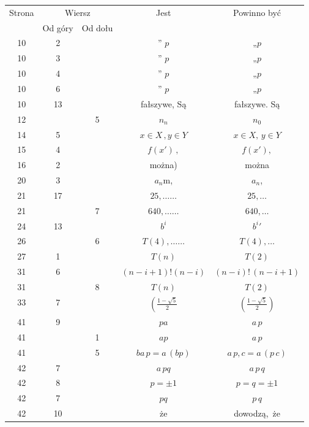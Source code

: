\documentclass[a4paper,11pt]{article}
\begin{document}
\begin{center}

  \begin{tabular}{|c|c|c|c|c|}
    \hline
    Strona & \multicolumn{2}{c|}{Wiersz} & Jest
                              & Powinno być \\ \cline{2-3}
    & Od góry & Od dołu & & \\
    \hline
    10  &  2 & & ” $p$ & „$p$ \\
    10  &  3 & & ” $p$ & „$p$ \\
    10  &  4 & & ” $p$ & „$p$ \\
    10  &  6 & & ” $p$ & „$p$ \\
    10  & 13 & & fałszywe, Są & fałszywe. Są \\
    12  & &  5 & $n_{ n }$ & $n_{ 0 }$ \\
    14  &  5 & & $x \in X \, , y \in Y$ & $x \in X, \, y \in Y$ \\
    15  &  4 & & $f( x' ) \, ,$ & $f( x' ),$ \\
    16  &  2 & & można) & można \\
    20  &  3 & & $a_{ n }$m, & $a_{ n }$, \\
    21  & 17 & & $25, \ldots \ldots$ & $25, \ldots$ \\
    21  & &  7 & $640, \ldots \ldots$ & $640, \ldots$ \\
    24  & 13 & & $b^{ i }$ & $b^{ i }{}'$ \\
    26  & &  6 & $T( 4 ), \ldots \ldots$ & $T( 4 ), \ldots$ \\
    27  &  1 & & $T( n )$ & $T( 2 )$ \\
    31  &  6 & & $( n - i + 1 )! ( n - i )$
    & $( n - i )! \, ( n - i + 1 )$ \\
    31  & &  8 & $T( n )$ & $T( 2 )$ \\
    33  &  7 & & $\left( \frac{ 1 - \sqrt{ 5 } }{ 2 } \right.$
    & $\left( \frac{ 1 - \sqrt{ 5 } }{ 2 } \right)$ \\
    41  &  9 & & $p a$ & $a \, p$ \\
    41  & &  1 & $a p$ & $a \, p$ \\
    41  & &  5 & $ba \, p = a \, ( b p )$ & $a \, p , c = a \, ( p \, c )$ \\
    42  &  7 & & $a \, p q$ & $a \, p \, q$ \\
    42  &  8 & & $p = \pm 1$ & $p = q = \pm 1$ \\
    42  &  7 & & $pq$ & $p \, q$ \\
    42  & 10 & & że & dowodzą,~że \\

\end{tabular}
\end{center}
\end{document}
